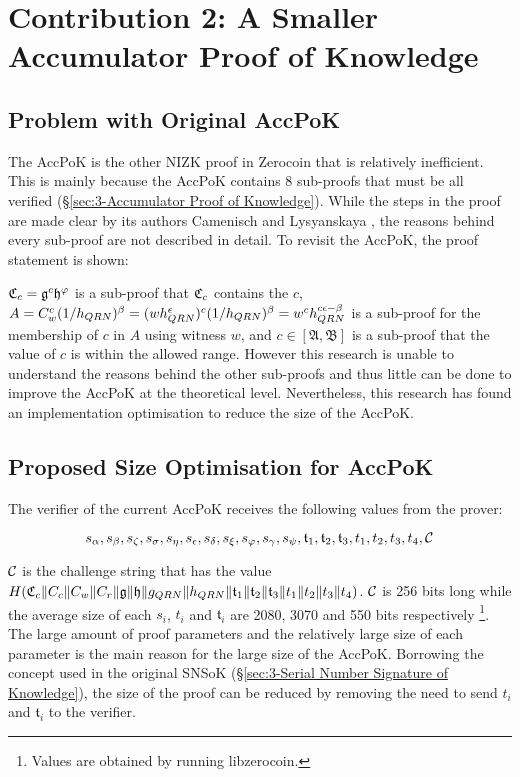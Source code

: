 \ifpdf
\graphicspath{{Chapter6/Figs/}}
\else
\graphicspath{{Chapter6/Figs/}}
\fi

\chapter{Contribution 2: A Smaller Accumulator Proof of Knowledge}
\label{ch:Contribution 2: A Smaller Accumulator Proof of Knowledge}
\section{Problem with Original AccPoK}
\label{sec:6-Problem with Original AccPoK}
The AccPoK is the other NIZK proof in Zerocoin that is relatively inefficient. This is mainly because the AccPoK contains 8 sub-proofs that must be all verified (\S\ref{sec:3-Accumulator Proof of Knowledge}). While the steps in the proof are made clear by its authors Camenisch and Lysyanskaya \cite{JanCamenisch12002}, the reasons behind every sub-proof are not described in detail. To revisit the AccPoK, the proof statement is shown:

\eqnAccPoKActual

$\mathfrak{C}_c=\mathfrak{g}^c\mathfrak{h}^\varphi$ is a sub-proof that $\mathfrak{C}_c$ contains the \kwCoin{} $c$, $A=C_w^c(1/h_{QRN})^\beta=(wh_{QRN}^{\epsilon})^{c}\allowbreak(1/h_{QRN})^\beta=w^{c}h_{QRN}^{c\epsilon-\beta}$ is a sub-proof for the membership of $c$ in $A$ using witness $w$, and $c\in[\mathfrak{A},\mathfrak{B}]$ is a sub-proof that the value of $c$ is within the allowed range. However this research is unable to understand the reasons behind the other sub-proofs and thus little can be done to improve the AccPoK at the theoretical level. Nevertheless, this research has found an implementation optimisation to reduce the size of the AccPoK.

\section{Proposed Size Optimisation for AccPoK}
\label{sec:6-Proposed Size Optimisation for AccPoK}
The verifier of the current AccPoK receives the following values from the prover:

$$s_\alpha,s_\beta,s_\zeta,s_\sigma,s_\eta,s_\epsilon,s_\delta,s_\xi,s_\varphi,s_\gamma,s_\psi,\mathfrak{t}_1,\mathfrak{t}_2,\mathfrak{t}_3,t_1,t_2,t_3,t_4,\mathcal{C}$$

$\mathcal{C}$ is the challenge string that has the value $H(\mathfrak{C}_c \| \allowbreak C_c \| \allowbreak C_w \| \allowbreak C_r \| \allowbreak \mathfrak{g} \| \allowbreak \mathfrak{h} \| \allowbreak g_{QRN} \| \allowbreak h_{QRN} \| \allowbreak \mathfrak{t}_1 \| \allowbreak \mathfrak{t}_2 \| \allowbreak \mathfrak{t}_3 \| \allowbreak t_1 \| \allowbreak t_2 \| \allowbreak t_3 \| \allowbreak t_4)$. $\mathcal{C}$ is 256 bits long while the average size of each $s_i$, $t_i$ and $\mathfrak{t}_i$ are 2080, 3070 and 550 bits respectively \footnote{Values are obtained by running libzerocoin.}. The large amount of proof parameters and the relatively large size of each parameter is the main reason for the large size of the AccPoK. Borrowing the concept used in the original SNSoK (\S\ref{sec:3-Serial Number Signature of Knowledge}), the size of the proof can be reduced by removing the need to send $t_i$ and $\mathfrak{t}_i$ to the verifier.

